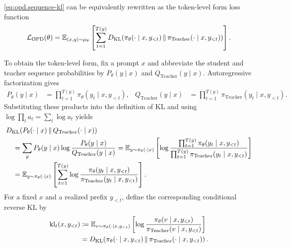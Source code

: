 \begin{highlight}
    \eqref{eq:opd.sequence-kl} can be equivalently rewritten as the token-level form loss function
    \begin{align*}
        {\cal L}_{\mathrm{OPD}}(\theta)
        =
        \mathbb{E}_{(x,y)\sim\mu_\theta}
        \left[
            \sum_{t=1}^{T(y)}
            D_{\mathrm{KL}}\!\left(
                \pi_\theta(\cdot\mid x,y_{<t})
                \,\middle\|\,
                \pi_{\mathrm{Teacher}}(\cdot\mid x,y_{<t})
            \right)
        \right].
    \end{align*}
\end{highlight}

To obtain the token-level form, fix a prompt $x$ and abbreviate the student
and teacher sequence probabilities by $P_\theta(y\mid x)$ and
$Q_{\mathrm{Teacher}}(y\mid x)$. Autoregressive factorization gives
\begin{align}
    P_\theta(y\mid x)
    &=
    \prod_{t=1}^{T(y)}\pi_\theta(y_t\mid x,y_{<t}),
    &
    Q_{\mathrm{Teacher}}(y\mid x)
    &=
    \prod_{t=1}^{T(y)}
    \pi_{\mathrm{Teacher}}(y_t\mid x,y_{<t}).
    \label{eq:opd.factorization}
\end{align}
Substituting these products into the definition of KL and using
$\log\prod_t a_t=\sum_t\log a_t$ yields
\begin{align}
    &D_{\mathrm{KL}}\!\left(
        P_\theta(\cdot\mid x)
        \,\middle\|\,
        Q_{\mathrm{Teacher}}(\cdot\mid x)
    \right)
    \nonumber\\
    &\quad=
    \sum_y P_\theta(y\mid x)
    \log\frac{P_\theta(y\mid x)}{Q_{\mathrm{Teacher}}(y\mid x)}
    = 
    \mathbb{E}_{y\sim\pi_\theta(\cdot\mid x)}
    \left[
        \log
        \frac{
            \prod_{t=1}^{T(y)}\pi_\theta(y_t\mid x,y_{<t})
        }{
            \prod_{t=1}^{T(y)}
            \pi_{\mathrm{Teacher}}(y_t\mid x,y_{<t})
        }
    \right]
    \nonumber\\
    &\quad=
    \mathbb{E}_{y\sim\pi_\theta(\cdot\mid x)}
    \left[
        \sum_{t=1}^{T(y)}
        \log
        \frac{
            \pi_\theta(y_t\mid x,y_{<t})
        }{
            \pi_{\mathrm{Teacher}}(y_t\mid x,y_{<t})
        }
    \right].
    \label{eq:opd.log-ratio-sum}
\end{align}
For a fixed $x$ and a realized prefix $y_{<t}$, define the corresponding conditional reverse KL by
\begin{align}
    \mathrm{kl}_t(x,y_{<t})
    &\coloneqq
    \mathbb{E}_{v\sim\pi_\theta(\cdot\mid x,y_{<t})}
    \left[\log\frac{\pi_\theta(v\mid x,y_{<t})}{\pi_{\mathrm{Teacher}}(v\mid x,y_{<t})}\right]
    \nonumber\\
    &=
    D_{\mathrm{KL}}\!\left(
        \pi_\theta(\cdot\mid x,y_{<t})
        \,\middle\|\,
        \pi_{\mathrm{Teacher}}(\cdot\mid x,y_{<t})
    \right).
    \label{eq:opd.conditional-token-kl}
\end{align}

